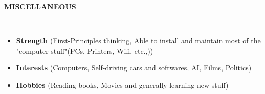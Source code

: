 \documentclass[a4paper,10pt]{article}
\newcommand{\lsep}{-0.5cm}
\newcommand{\resheading}[1]{{\small \colorbox{mygrey}{\begin{minipage}{0.975\textwidth}{\textbf{#1 \vphantom{p\^{E}}}}\end{minipage}}}}
\begin{document}
\resheading{\textbf{MISCELLANEOUS} }\\[\lsep]
\begin{itemize}
\item \textbf{Strength} (First-Principles thinking, Able to install and maintain most of the "computer stuff"(PCs, Printers, Wifi, etc.,))
\item \textbf{Interests} (Computers, Self-driving cars and softwares, AI, Films, Politics)
\item \textbf{Hobbies} (Reading books, Movies and generally learning new stuff)
\end{itemize}
\end{document}
